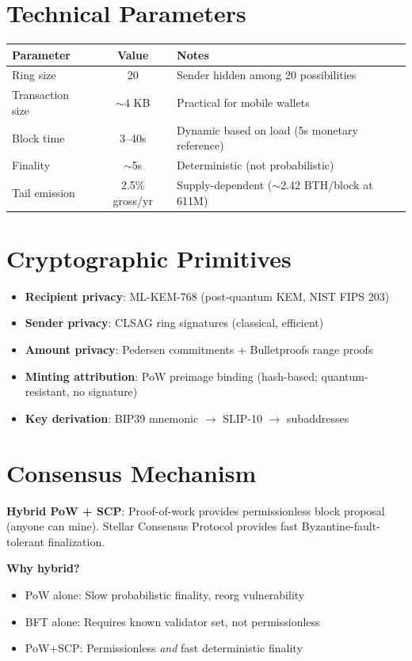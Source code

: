 \documentclass[11pt]{article}
\begin{document}
\section*{Technical Parameters}

\begin{tabular}{@{}lcl@{}}
\toprule
\textbf{Parameter} & \textbf{Value} & \textbf{Notes} \\
\midrule
Ring size & 20 & Sender hidden among 20 possibilities \\
Transaction size & $\sim$4 KB & Practical for mobile wallets \\
Block time & 3--40s & Dynamic based on load (5s monetary reference) \\
Finality & $\sim$5s & Deterministic (not probabilistic) \\
Tail emission & 2.5\% gross/yr & Supply-dependent ($\sim$2.42 BTH/block at 611M) \\
\bottomrule
\end{tabular}

\section*{Cryptographic Primitives}

\begin{itemize}
\item \textbf{Recipient privacy}: ML-KEM-768 (post-quantum KEM, NIST FIPS 203)
\item \textbf{Sender privacy}: CLSAG ring signatures (classical, efficient)
\item \textbf{Amount privacy}: Pedersen commitments + Bulletproofs range proofs
\item \textbf{Minting attribution}: PoW preimage binding (hash-based; quantum-resistant, no signature)
\item \textbf{Key derivation}: BIP39 mnemonic $\rightarrow$ SLIP-10 $\rightarrow$ subaddresses
\end{itemize}

\section*{Consensus Mechanism}

\textbf{Hybrid PoW + SCP}: Proof-of-work provides permissionless block proposal
(anyone can mine). Stellar Consensus Protocol provides fast Byzantine-fault-tolerant
finalization.

\textbf{Why hybrid?}
\begin{itemize}
\item PoW alone: Slow probabilistic finality, reorg vulnerability
\item BFT alone: Requires known validator set, not permissionless
\item PoW+SCP: Permissionless \emph{and} fast deterministic finality
\end{itemize}
\end{document}

